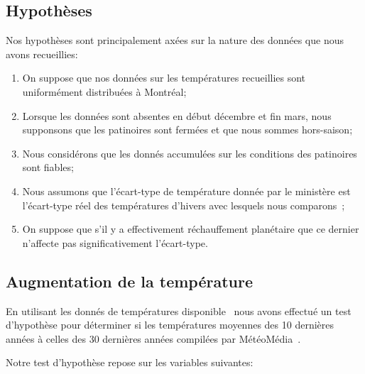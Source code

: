 \documentclass[12pt]{article}
\numberwithin{figure}{section}
\begin{document}
\subsection{Hypoth\`eses}

Nos hypoth\`eses sont principalement ax\'ees sur la nature des donn\'ees que nous avons recueillies:

\begin{enumerate}
    \item On suppose que nos donn\'ees sur les temp\'eratures recueillies sont uniform\'ement
        distribu\'ees \`a Montr\'eal;
    \item Lorsque les donn\'ees sont absentes en d\'ebut d\'ecembre et fin mars, nous supponsons que
        les patinoires sont ferm\'ees et que nous sommes hors-saison;
    \item Nous consid\'erons que les donn\'es accumul\'ees sur les conditions des patinoires sont
        fiables;
    \item Nous assumons que l'\'ecart-type de temp\'erature donn\'ee par le minist\`ere est
        l'\'ecart-type r\'eel des temp\'eratures d'hivers avec lesquels nous comparons~\cite{AvgTemp};
    \item On suppose que s'il y a effectivement r\'echauffement plan\'etaire que ce dernier
        n'affecte pas significativement l'\'ecart-type.
\end{enumerate}

\subsection{Augmentation de la temp\'erature}

En utilisant les donn\'es de temp\'eratures disponible~\cite{TempHist} nous avons effectu\'e un test
d'hypoth\`ese pour d\'eterminer si les temp\'eratures moyennes des 10 derni\`eres ann\'ees \`a
celles des 30 derni\`eres ann\'ees compil\'ees par M\'et\'eoM\'edia~\cite{MeteoTemp}.

Notre test d'hypoth\`ese repose sur les variables suivantes:
\end{document}
